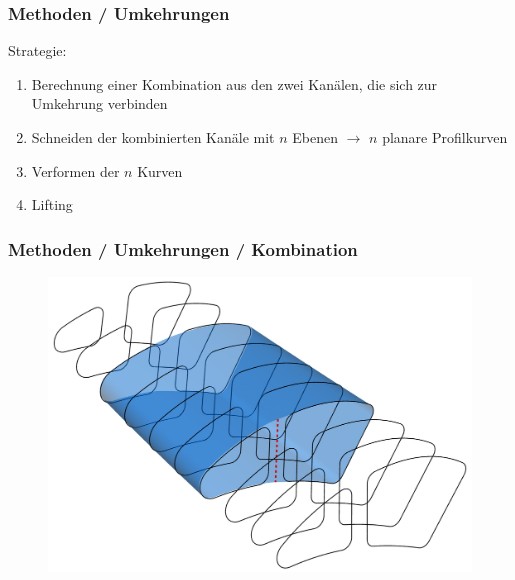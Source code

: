 \documentclass[8pt, aspectratio=169]{beamer}
\begin{document}
\begin{frame}
\begin{minipage}{\textwidth}
\begin{figure}[H]
\begin{subfigure}{0.42\textwidth}
			\end{subfigure}
		\end{figure}
	\end{minipage} 
\end{frame}

\begin{frame}
	\frametitle{Methoden / Umkehrungen}
	\vspace{-1cm}\hspace{-0.5cm}
	\begin{minipage}[t]{\textwidth}
		Strategie:
		\begin{enumerate}
			\item Berechnung einer Kombination aus den zwei Kanälen, die sich zur Umkehrung verbinden
			\item Schneiden der kombinierten Kanäle mit $n$ Ebenen $\rightarrow$ $n$ planare Profilkurven
			\item Verformen der $n$ Kurven
			\item Lifting
		\end{enumerate}
	\end{minipage}
\end{frame}

\begin{frame}
	\frametitle{Methoden / Umkehrungen / Kombination}
	\vspace{-1cm}\hspace{-0.5cm}
	\begin{figure}
		\centering
		\includegraphics[height=.8\textheight]{../tec/turn/12.png}
	\end{figure}
\end{frame}
\end{document}
